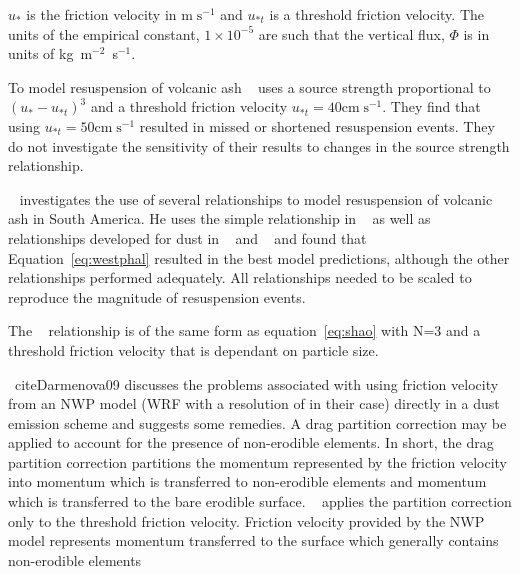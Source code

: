 
$u_*$ is the friction velocity in $\mathrm{m}\;\mathrm{s}^{-1}$ and $u_{*t}$ is a threshold friction velocity.
The units of the empirical constant, $1\times10^{-5}$ are such that the vertical flux, $\Phi$ is in units of kg~m$^{-2}$~s$^{-1}$.


To model resuspension of volcanic ash ~\cite{Leadbetter12} uses a source strength proportional to
$(u_{*}-u_{*t})^{3}$ and a threshold friction velocity $u_{*t} = 40 \mathrm{cm} \; \mathrm{s}^{-1}$. 
They find that using $u_{*t} = 50 \mathrm{cm} \; \mathrm{s}^{-1}$ resulted in missed or shortened resuspension events. 
They do not investigate the sensitivity of their results to changes in
the source strength relationship.

~\cite{Folch14} investigates the use of several relationships to model resuspension of volcanic ash in South America.
He uses the simple relationship in ~\cite{westphal} as well as relationships developed for dust in ~\cite{Marticorena97} and
~\cite{Shao93} and found that Equation~\ref{eq:westphal} resulted in the best model predictions, although the other
relationships performed adequately. All relationships needed to be scaled to reproduce the magnitude of resuspension events.

The ~\cite{Marticorena97} relationship is of the same form as equation~\ref{eq:shao} with N=3 and a  threshold friction velocity
that is dependant on particle size. 

~cite{Darmenova09} discusses the problems associated with using friction velocity from an NWP model (WRF with a resolution of in their case) directly in a dust emission scheme and suggests some remedies. 
A drag partition correction may be applied to account for the presence of non-erodible elements. In short, the drag partition correction partitions the momentum represented by the friction velocity into momentum which is transferred to non-erodible elements and momentum which is transferred to the bare erodible surface. 
~\cite{Darmenova} applies the partition correction only to the threshold friction velocity.
Friction velocity provided by the NWP model represents momentum transferred to the surface which generally contains non-erodible elements 

